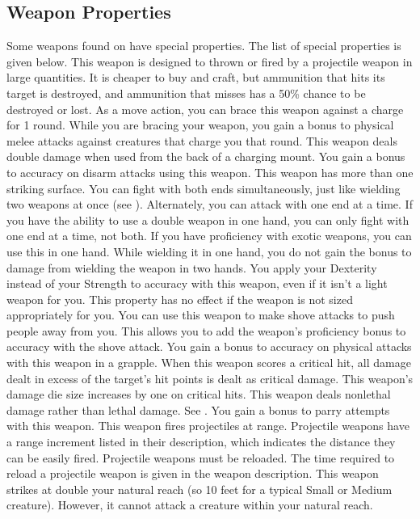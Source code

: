 \subsection{Weapon Properties}
Some weapons found on  have special properties. The list of special properties is given below.
 This weapon is designed to thrown or fired by a projectile weapon in large quantities. It is cheaper to buy and craft, but ammunition that hits its target is destroyed, and ammunition that misses has a 50\% chance to be destroyed or lost.
 As a move action, you can brace this weapon against a charge for 1 round. While you are bracing your weapon, you gain a  bonus to physical melee attacks against creatures that charge you that round.
 This weapon deals double damage when used from the back of a charging mount.
 You gain a  bonus to accuracy on disarm attacks using this weapon.
 This weapon has more than one striking surface. You can fight with both ends simultaneously, just like wielding two weapons at once (see ). Alternately, you can attack with one end at a time. If you have the ability to use a double weapon in one hand, you can only fight with one end at a time, not both.
 If you have proficiency with exotic weapons, you can use this in one hand. While wielding it in one hand, you do not gain the  bonus to damage from wielding the weapon in two hands.
 You apply your Dexterity instead of your Strength to accuracy with this weapon, even if it isn't a light weapon for you.
This property has no effect if the weapon is not sized appropriately for you.
 You can use this weapon to make shove attacks to push people away from you. This allows you to add the weapon's proficiency bonus to accuracy with the shove attack.
 You gain a  bonus to accuracy on physical attacks with this weapon in a grapple.
 When this weapon scores a critical hit, all damage dealt in excess of the target's hit points is dealt as critical damage.
 This weapon's damage die size increases by one on critical hits.
 This weapon deals nonlethal damage rather than lethal damage. See .
 You gain a  bonus to parry attempts with this weapon.
 This weapon fires projectiles at range. Projectile weapons have a range increment listed in their description, which indicates the distance they can be easily fired. Projectile weapons must be reloaded. The time required to reload a projectile weapon is given in the weapon description.
 This weapon strikes at double your natural reach (so 10 feet for a typical Small or Medium creature). However, it cannot attack a creature within your natural reach.

